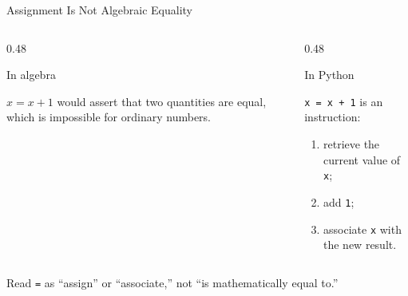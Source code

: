 \documentclass[aspectratio=169,10pt]{beamer}
\begin{document}
\begin{frame}{Assignment Is Not Algebraic Equality}

  \begin{columns}[T,onlytextwidth]

    \begin{column}{0.48\textwidth}

      \begin{block}{In algebra}

        $x = x + 1$ would assert that two quantities are equal, which is impossible for ordinary numbers.

      \end{block}

    \end{column}

    \begin{column}{0.48\textwidth}

      \begin{block}{In Python}

        \texttt{x = x + 1} is an instruction:

        \begin{enumerate}
          \item retrieve the current value of \texttt{x};
          \item add \texttt{1};
          \item associate \texttt{x} with the new result.
        \end{enumerate}

      \end{block}

    \end{column}

  \end{columns}

  \begin{keyidea}

    Read \texttt{=} as ``assign'' or ``associate,'' not ``is mathematically equal to.''

  \end{keyidea}

\end{frame}
\end{document}
